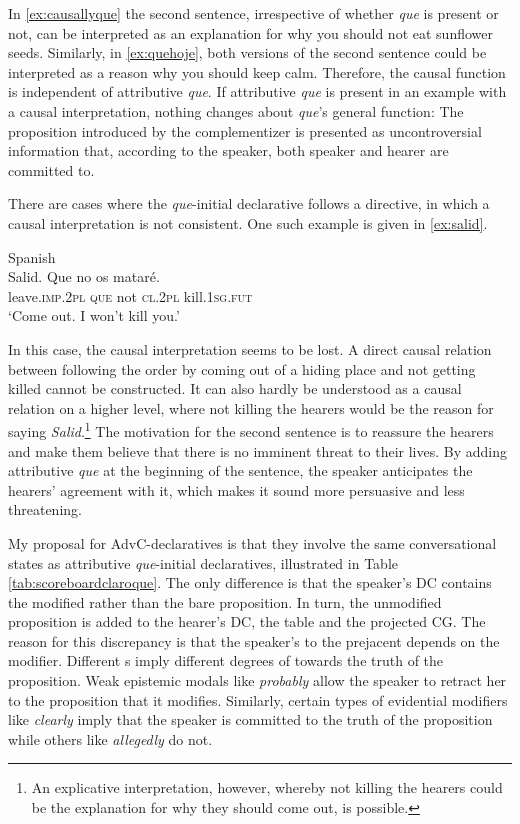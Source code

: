 In \eqref{ex:causallyque} the second sentence, irrespective of whether \emph{que} is present or not, can be interpreted as an explanation for why you should not eat sunflower seeds. Similarly, in \eqref{ex:quehoje}, both versions of the second sentence  could be interpreted as a reason why you should keep calm.  
Therefore, the causal function is independent of attributive \emph{que}. If attributive \emph{que} is present in an example with a causal interpretation, nothing changes about \emph{que}'s general function: The proposition introduced by the complementizer is  presented as uncontroversial information that, according to the speaker,  both speaker and hearer are committed to. 

There are cases  where the \emph{que}-initial declarative follows a directive, in which a causal interpretation is not  consistent. One such example is given in \eqref{ex:salid}. 

\ea Spanish\\
\label{ex:salid}\gll  Salid. Que no os mataré. \\
	leave.\textsc{imp.2pl} \textsc{que} not \textsc{cl.2pl} kill.\textsc{1sg.fut}\\
	\glt `Come out. I won't kill you.'
\z


In this case, the causal interpretation seems to be lost. A direct causal  relation between following the order by coming out of a hiding place and not getting killed cannot be constructed.  It can also hardly be understood as a causal relation on a higher level,  where not killing the hearers would be  the reason for saying \emph{Salid}.\footnote{An explicative interpretation, however,  whereby not killing the hearers could be the explanation for why they should come out, is  possible.} The motivation for the second sentence is  to reassure the hearers and make them believe that there is no imminent threat to their lives. By adding  attributive \emph{que} at the beginning of the  sentence, the speaker  anticipates the hearers' agreement with it, which makes it sound more  persuasive and less threatening.



My proposal for AdvC-declaratives is that they involve the same conversational states as attributive \emph{que}-initial declaratives, illustrated in Table \ref{tab:scoreboardclaroque}. The only difference is that the speaker's DC contains the modified rather than the bare proposition. In turn, the unmodified proposition is  added to the hearer's DC, the table and the projected CG. The reason for this discrepancy is that the speaker's  to the prejacent depends on the modifier. Different s imply different degrees of  towards  the truth of the proposition. Weak epistemic modals like \emph{probably} allow the speaker to retract her  to the proposition that it modifies. Similarly, certain types of evidential modifiers like \emph{clearly} imply that the speaker is committed to the truth of the proposition while others like \emph{allegedly} do not.

